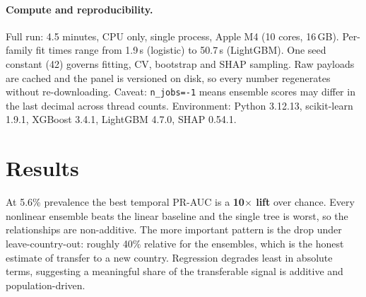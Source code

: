 \documentclass[11pt]{article}
\begin{document}
\paragraph{Compute and reproducibility.} Full run: 4.5 minutes,
CPU only, single process, Apple M4 (10 cores, 16\,GB). Per-family fit times range from
1.9\,s (logistic) to
50.7\,s (LightGBM). One seed constant (42) governs
fitting, CV, bootstrap and SHAP sampling. Raw payloads are cached and the panel is versioned on
disk, so every number regenerates without re-downloading. Caveat: \texttt{n\_jobs=-1} means
ensemble scores may differ in the last decimal across thread counts. Environment: Python
3.12.13, scikit-learn 1.9.1, XGBoost 3.4.1,
LightGBM 4.7.0, SHAP 0.54.1.

\section{Results}

\begin{table}[H]
\centering
\caption{Level 1 (country-year). Brackets are 95\% bootstrap intervals on the temporal holdout.
$\star$ marks the model selected on leave-country-out PR-AUC.}
\small
{}
\end{table}

\noindent
At 5.6\% prevalence the best temporal PR-AUC is a \textbf{10$\times$ lift} over
chance. Every nonlinear ensemble beats the linear baseline and the single tree is worst, so the
relationships are non-additive. The more important pattern is the drop under leave-country-out:
roughly 40\% relative for the ensembles, which is the honest estimate of transfer to a new country.
Regression degrades least in absolute terms, suggesting a meaningful share of the transferable
signal is additive and population-driven.
\end{document}

